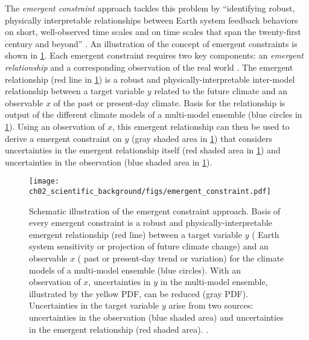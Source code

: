 The \emph{emergent constraint} approach tackles this problem by
\enquote{identifying robust, physically interpretable relationships between
  Earth system feedback behaviors on short, well-observed time scales and on
  time scales that span the twenty-first century and beyond}
\autocite{Eyring2019}. An illustration of the concept of emergent constraints
is shown in \cref{fig:02:emergent_constraint}. Each emergent constraint
requires two key components: an \emph{emergent relationship} and a
corresponding observation of the real world \autocite{Eyring2019}. The emergent
relationship (red line in \cref{fig:02:emergent_constraint}) is a robust and
physically-interpretable inter-model relationship between a target variable $y$
related to the future climate and an observable $x$ of the past or present-day
climate. Basis for the relationship is output of the different climate models
of a multi-model ensemble (blue circles in \cref{fig:02:emergent_constraint}).
Using an observation of $x$, this emergent relationship can then be used to
derive a emergent constraint on $y$ (gray shaded area in
\cref{fig:02:emergent_constraint}) that considers uncertainties in the emergent
relationship itself (red shaded area in \cref{fig:02:emergent_constraint}) and
uncertainties in the observation (blue shaded area in
\cref{fig:02:emergent_constraint}).

\begin{figure}[t]
  \centering
  \texttt{[image: 
    ch02\_scientific\_background/figs/emergent\_constraint.pdf]}
  \caption[
    Schematic illustration of the emergent constraint approach.
  ]{
    Schematic illustration of the emergent constraint approach. Basis of every
    emergent constraint is a robust and physically-interpretable emergent
    relationship (red line) between a target variable $y$ (\eg{} Earth system
    sensitivity or projection of future climate change) and an observable $x$
    (\eg{} past or present-day trend or variation) for the climate models of a
    multi-model ensemble (blue circles). With an observation of $x$,
    uncertainties in $y$ in the multi-model ensemble, illustrated by the yellow
    \acf{PDF}, can be reduced (gray \acs{PDF}). Uncertainties in the target
    variable $y$ arise from two sources: uncertainties in the observation (blue
    shaded area) and uncertainties in the emergent relationship (red shaded
    area). .
  }
  \label{fig:02:emergent_constraint}
\end{figure}

